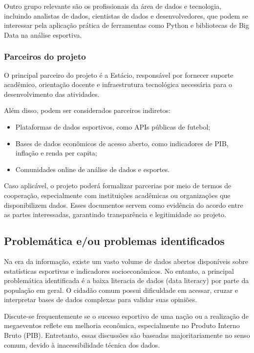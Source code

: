 \documentclass[12pt, a4paper, brazil]{article}
\begin{document}
Outro grupo relevante são os profissionais da área de dados e tecnologia, incluindo analistas de dados, cientistas de dados e desenvolvedores, que podem se interessar pela aplicação prática de ferramentas como Python e bibliotecas de Big Data na análise esportiva.

\subsubsection{Parceiros do projeto}
O principal parceiro do projeto é a Estácio, responsável por fornecer suporte acadêmico, orientação docente e infraestrutura tecnológica necessária para o desenvolvimento das atividades.

Além disso, podem ser considerados parceiros indiretos:
\begin{itemize}
    \item Plataformas de dados esportivos, como APIs públicas de futebol;
    \item Bases de dados econômicos de acesso aberto, como indicadores de PIB, inflação e renda per capita;
    \item Comunidades online de análise de dados e esportes.
\end{itemize}

Caso aplicável, o projeto poderá formalizar parcerias por meio de termos de cooperação, especialmente com instituições acadêmicas ou organizações que disponibilizem dados. Esses documentos servem como evidência do acordo entre as partes interessadas, garantindo transparência e legitimidade ao projeto.

\subsection{Problemática e/ou problemas identificados}
Na era da informação, existe um vasto volume de dados abertos disponíveis sobre estatísticas esportivas e indicadores socioeconômicos. No entanto, a principal problemática identificada é a baixa literacia de dados (data literacy) por parte da população em geral. O cidadão comum possui dificuldade em acessar, cruzar e interpretar bases de dados complexas para validar suas opiniões.

Discute-se frequentemente se o sucesso esportivo de uma nação ou a realização de megaeventos reflete em melhoria econômica, especialmente no Produto Interno Bruto (PIB). Entretanto, essas discussões são baseadas majoritariamente no senso comum, devido à inacessibilidade técnica dos dados.
\end{document}
